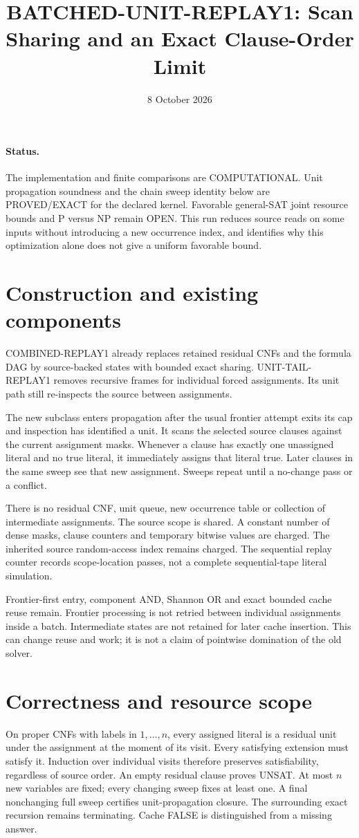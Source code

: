 \documentclass[11pt]{article}
\title{BATCHED-UNIT-REPLAY1: Scan Sharing and an Exact Clause-Order Limit}
\date{8 October 2026}
\begin{document}
\sloppy\maketitle
\paragraph{Status.}
The implementation and finite comparisons are COMPUTATIONAL.
Unit propagation soundness and the chain sweep identity below are
PROVED/EXACT for the declared kernel. Favorable general-SAT joint resource
bounds and P versus NP remain OPEN. This run reduces source reads on
some inputs without introducing a new occurrence index, and identifies
why this optimization alone does not give a uniform favorable bound.

\section{Construction and existing components}
COMBINED-REPLAY1 already replaces retained residual CNFs and the formula
DAG by source-backed states with bounded exact sharing. UNIT-TAIL-REPLAY1
removes recursive frames for individual forced assignments. Its unit
path still re-inspects the source between assignments.

The new subclass enters propagation after the usual frontier attempt
exits its cap and inspection has identified a unit. It scans the selected
source clauses against the current assignment masks. Whenever a clause
has exactly one unassigned literal and no true literal, it immediately
assigns that literal true. Later clauses in the same sweep see that new
assignment. Sweeps repeat until a no-change pass or a conflict.

There is no residual CNF, unit queue, new occurrence table or collection
of intermediate assignments. The source scope is shared. A constant
number of dense masks, clause counters and temporary bitwise values
are charged. The inherited source random-access index remains
charged. The sequential replay counter records scope-location passes,
not a complete sequential-tape literal simulation.

Frontier-first entry, component AND, Shannon OR and exact bounded cache
reuse remain. Frontier processing is not retried between individual
assignments inside a batch. Intermediate states are not retained for
later cache insertion. This can change reuse and work; it is not a
claim of pointwise domination of the old solver.

\section{Correctness and resource scope}
On proper CNFs with labels in $1,\ldots,n$, every assigned literal is a
residual unit under the assignment at the moment of its visit. Every
satisfying extension must satisfy it. Induction over individual visits
therefore preserves satisfiability, regardless of source order. An empty
residual clause proves UNSAT. At most $n$ new variables are fixed;
every changing sweep fixes at least one. A final nonchanging full sweep
certifies unit-propagation closure. The surrounding exact recursion
remains terminating. Cache FALSE is distinguished from a missing answer.
\end{document}
